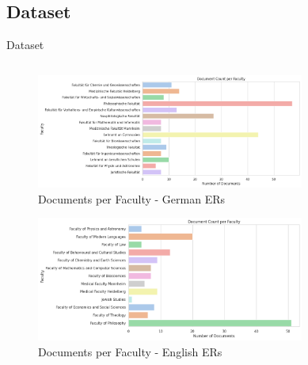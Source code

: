 \documentclass{beamer}
\begin{document}
\subsection{Dataset}


\begin{frame}{Dataset}
  \begin{columns}
    \begin{column}{.5\textwidth}
      \begin{figure}
        \includegraphics[width=0.9\textwidth]{Grafiken/PO_german_Document Count per Faculty.png}
        \caption{Documents per Faculty - German ERs}
      \end{figure}
      \begin{figure}
        \includegraphics[width=0.9\textwidth]{Grafiken/PO_english_Document Count per Faculty.png}
        \caption{Documents per Faculty - English ERs}
      \end{figure}
    \end{column}
    \begin{column}{.5\textwidth}
      \begin{figure}

\end{figure}
\end{column}
\end{columns}
\end{frame}
\end{document}

